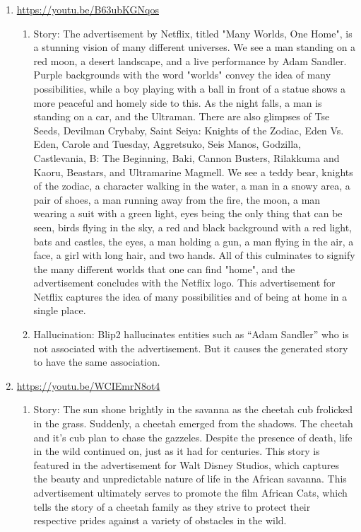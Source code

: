 \documentclass[hidelinks,11pt,a4paper]{report}
\begin{document}
\begin{enumerate}
    \item  \url{https://youtu.be/B63ubKGNqos} 
    \begin{enumerate}
        \item Story: The advertisement by Netflix, titled "Many Worlds, One Home", is a stunning vision of many different universes. We see a man standing on a red moon, a desert landscape, and a live performance by Adam Sandler. Purple backgrounds with the word "worlds" convey the idea of many possibilities, while a boy playing with a ball in front of a statue shows a more peaceful and homely side to this. As the night falls, a man is standing on a car, and the Ultraman. There are also glimpses of Tse Seeds, Devilman Crybaby, Saint Seiya: Knights of the Zodiac, Eden Vs. Eden, Carole and Tuesday, Aggretsuko, Seis Manos, Godzilla, Castlevania, B: The Beginning, Baki, Cannon Busters, Rilakkuma and Kaoru, Beastars, and Ultramarine Magmell. We see a teddy bear, knights of the zodiac, a character walking in the water, a man in a snowy area, a pair of shoes, a man running away from the fire, the moon, a man wearing a suit with a green light, eyes being the only thing that can be seen, birds flying in the sky, a red and black background with a red light, bats and castles, the eyes, a man holding a gun, a man flying in the air, a face, a girl with long hair, and two hands. All of this culminates to signify the many different worlds that one can find "home", and the advertisement concludes with the Netflix logo. This advertisement for Netflix captures the idea of many possibilities and of being at home in a single place.
        
        \item Hallucination: Blip2 hallucinates entities such as ``Adam Sandler'' who is not associated with the advertisement. But it causes the generated story to have the same association.
    \end{enumerate}
    
    

    \item \url{https://youtu.be/WCIEmrN8ot4} 
    \begin{enumerate}
        \item Story: The sun shone brightly in the savanna as the cheetah cub frolicked in the grass. Suddenly, a cheetah emerged from the shadows. The cheetah and it's cub plan to chase the gazzeles. Despite the presence of death, life in the wild continued on, just as it had for centuries. This story is featured in the advertisement for Walt Disney Studios, which captures the beauty and unpredictable nature of life in the African savanna. This advertisement ultimately serves to promote the film African Cats, which tells the story of a cheetah family as they strive to protect their respective prides against a variety of obstacles in the wild.
        

\end{enumerate}
\end{enumerate}
\end{document}
